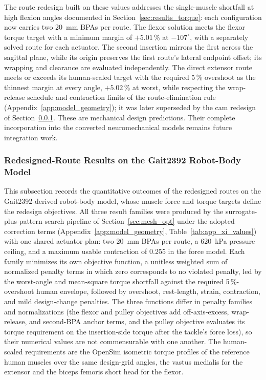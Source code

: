 The route redesign built on these values addresses the single-muscle shortfall at high flexion angles documented in Section~\ref{sec:results_torque}: each configuration now carries two \qty{20}{\mm} BPAs per route. The flexor solution meets the flexor torque target with a minimum margin of $+5.01$\,\% at $-107^{\circ}$, with a separately solved route for each actuator. The second insertion mirrors the first across the sagittal plane, while its origin preserves the first route's lateral endpoint offset; its wrapping and clearance are evaluated independently. The direct extensor route meets or exceeds its human-scaled target with the required 5\,\% overshoot as the thinnest margin at every angle, $+5.02$\,\% at worst, while respecting the wrap-release schedule and contraction limits of the route-elimination rule (Appendix~\ref{app:model_geometry}); it was later superseded by the cam redesign of Section~\ref{sec:route_redesign_results}. These are mechanical design predictions. Their complete incorporation into the converted neuromechanical models remains future integration work.

\subsubsection{Redesigned-Route Results on the Gait2392 Robot-Body Model}\label{sec:route_redesign_results}

This subsection records the quantitative outcomes of the redesigned routes on the Gait2392-derived robot-body model, whose muscle force and torque targets define the redesign objectives. All three result families were produced by the surrogate-plus-pattern-search pipeline of Section~\ref{sec:mesh_opt} under the adopted correction terms (Appendix~\ref{app:model_geometry}, Table~\ref{tab:app_xi_values}) with one shared actuator plan: two \qty{20}{\mm} BPAs per route, a \qty{620}{\kPa} pressure ceiling, and a maximum usable contraction of 0.255 in the force model. Each family minimizes its own objective function, a unitless weighted sum of normalized penalty terms in which zero corresponds to no violated penalty, led by the worst-angle and mean-square torque shortfall against the required 5\,\%-overshoot human envelope, followed by overshoot, rest-length, strain, contraction, and mild design-change penalties. The three functions differ in penalty families and normalizations (the flexor and pulley objectives add off-axis-excess, wrap-release, and second-BPA anchor terms, and the pulley objective evaluates its torque requirement on the insertion-side torque after the tackle's force loss), so their numerical values are not commensurable with one another. The human-scaled requirements are the OpenSim isometric torque profiles of the reference human muscles over the same design-grid angles, the vastus medialis for the extensor and the biceps femoris short head for the flexor.

